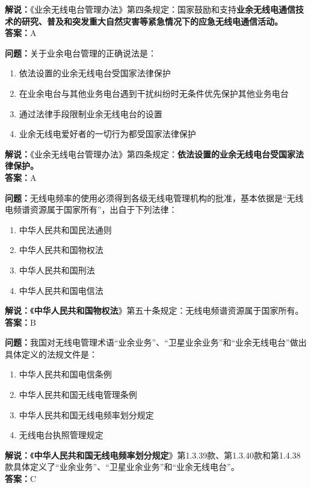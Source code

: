 \noindent\textbf{解说：}《业余无线电台管理办法》第四条规定：国家鼓励和支持\textbf{业余无线电通信技术的研究、普及和突发重大自然灾害等紧急情况下的应急无线电通信活动。}\\\noindent\textbf{答案：}A

\bigskip


\noindent\textbf{问题：}关于业余电台管理的正确说法是：

\begin{enumerate}[label=\Alph*), leftmargin=3em]
	\item 依法设置的业余无线电台受国家法律保护
	\item 在业余电台与其他业务电台遇到干扰纠纷时无条件优先保护其他业务电台
	\item 通过法律手段限制业余无线电台的设置
	\item 业余无线电爱好者的一切行为都受国家法律保护
\end{enumerate}

\noindent\textbf{解说：}《业余无线电台管理办法》第四条规定：\textbf{依法设置的业余无线电台受国家法律保护。}\\\noindent\textbf{答案：}A

\bigskip


\noindent\textbf{问题：}无线电频率的使用必须得到各级无线电管理机构的批准，基本依据是“无线电频谱资源属于国家所有”，出自于下列法律：

\begin{enumerate}[label=\Alph*), leftmargin=3em]
	\item 中华人民共和国民法通则
	\item 中华人民共和国物权法
	\item 中华人民共和国刑法
	\item 中华人民共和国电信法
\end{enumerate}

\noindent\textbf{解说：}《\textbf{中华人民共和国物权法}》第五十条规定：无线电频谱资源属于国家所有。\\\noindent\textbf{答案：}B

\bigskip


\noindent\textbf{问题：}我国对无线电管理术语“业余业务”、“卫星业余业务”和“业余无线电台”做出具体定义的法规文件是：
\begin{enumerate}[label=\Alph*), leftmargin=3em]
	\item 中华人民共和国电信条例
	\item 中华人民共和国无线电管理条例
	\item 中华人民共和国无线电频率划分规定
	\item 无线电台执照管理规定
\end{enumerate}
\textbf{解说：}《\textbf{中华人民共和国无线电频率划分规定}》第1.3.39款、第1.3.40款和第1.4.38款具体定义了“业余业务”、“卫星业余业务”和“业余无线电台”。\\\noindent\textbf{答案：}C

